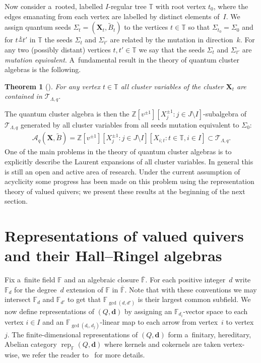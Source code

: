 \documentclass[pdftex]{sigma}
\numberwithin{equation}{section}
\newtheorem{Theorem}{Theorem}[section]
\begin{document}
Now consider a~rooted, labelled
$I$-regular tree $\mathbb{T}$ with root vertex $t_0$, where the edges emanating from each vertex are labelled %
by distinct elements of~$I$.
We assign quantum seeds $\Sigma_t=(\mathbf{X}_t,\widetilde B_t)$ to the vertices $t\in\mathbb{T}$ so that
$\Sigma_{t_0}=\Sigma_0$ and for $t\frac{ \ k }{}t'$ in $\mathbb{T}$ the seeds $\Sigma_t$ and $\Sigma_{t'}$ are related  %
by the mutation in direction~$k$.
For any two (possibly distant) vertices $t,t'\in\mathbb{T}$ we say that the seeds $\Sigma_t$ and $\Sigma_{t'}$ are
\emph{mutation equivalent}.
A~fundamental result in the theory of quantum cluster algebras is the following.
\begin{Theorem}[]
For any vertex $t\in\mathbb{T}$ all cluster variables of the cluster $\mathbf{X}_t$ are contained in $\mathcal{T}_{\Lambda,q}$.
\end{Theorem}
The quantum cluster algebra is then the $\mathbb{Z}[v^{\pm1}][X_j^{\pm1}:j\in J\setminus I]$-subalgebra of
$\mathcal{T}_{\Lambda,q}$ generated by all cluster variables from all seeds mutation equivalent to $\Sigma_0$:
\begin{gather*}
\mathcal{A}_q(\mathbf{X},\widetilde B)=\mathbb{Z}[v^{\pm1}][X_j^{\pm1}:j\in J\setminus I][X_{i;t}: t\in\mathbb{T},i\in
I]\subset\mathcal{T}_{\Lambda,q}.
\end{gather*}
One of the main problems in the theory of quantum cluster algebras is to explicitly describe the Laurent expansions of
all cluster variables.
In general this is still an open and active area of research.
Under the current assumption of acyclicity some progress has been made on this problem using the representation theory
of valued quivers; we present these results at the beginning of the next section.

\section{Representations of valued quivers\\ and their Hall--Ringel
algebras}\label{sec:valued quivers}

Fix a~f\/inite f\/ield $\mathbb{F}$ and an algebraic closure $\bar{\mathbb{F}}$.
For each positive integer~$d$ write $\mathbb{F}_d$ for the degree~$d$ extension of $\mathbb{F}$ in $\bar{\mathbb{F}}$.
Note that with these conventions we may intersect $\mathbb{F}_d$ and $\mathbb{F}_{d'}$ to get that
$\mathbb{F}_{\gcd(d,d')}$ is their largest common subf\/ield.
We now def\/ine representations of $(Q,\mathbf{d})$ by assigning an $\mathbb{F}_{d_i}$-vector space to each vertex $i\in
I$ and an $\mathbb{F}_{\gcd(d_i,d_j)}$-linear map to each arrow from vertex~$i$ to vertex~$j$.
The f\/inite-dimensional representations of $(Q,\mathbf{d})$ form a~f\/initary, hereditary, Abelian category
$\operatorname{rep}_\mathbb{F}(Q,\mathbf{d})$ where kernels and cokernels are taken vertex-wise, we refer the reader  %
to~\cite{rupel1} for more details.
\end{document}
